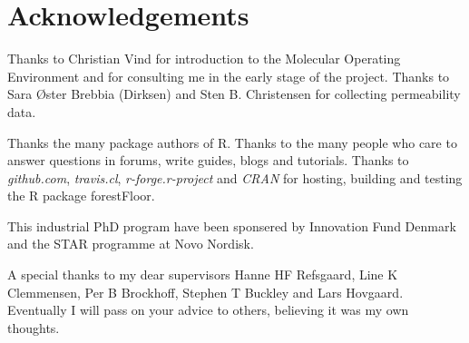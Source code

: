 \chapter{Acknowledgements}
Thanks to Christian Vind for introduction to the Molecular Operating Environment and for consulting me in the early stage of the project. Thanks to Sara Øster Brebbia (Dirksen) and Sten B. Christensen for collecting permeability data.

Thanks the many package authors of R. Thanks to the many people who care to answer questions in forums, write guides, blogs and tutorials. Thanks to \textit{github.com}, \textit{travis.cl}, \textit{r-forge.r-project} and \textit{CRAN} for hosting, building and testing the R package forestFloor.

This industrial PhD program have been sponsered by Innovation Fund Denmark and the STAR programme at Novo Nordisk.

A special thanks to my dear supervisors Hanne HF Refsgaard, Line K Clemmensen, Per B Brockhoff, Stephen T Buckley and Lars Hovgaard. Eventually I will pass on your advice to others, believing it was my own thoughts.
